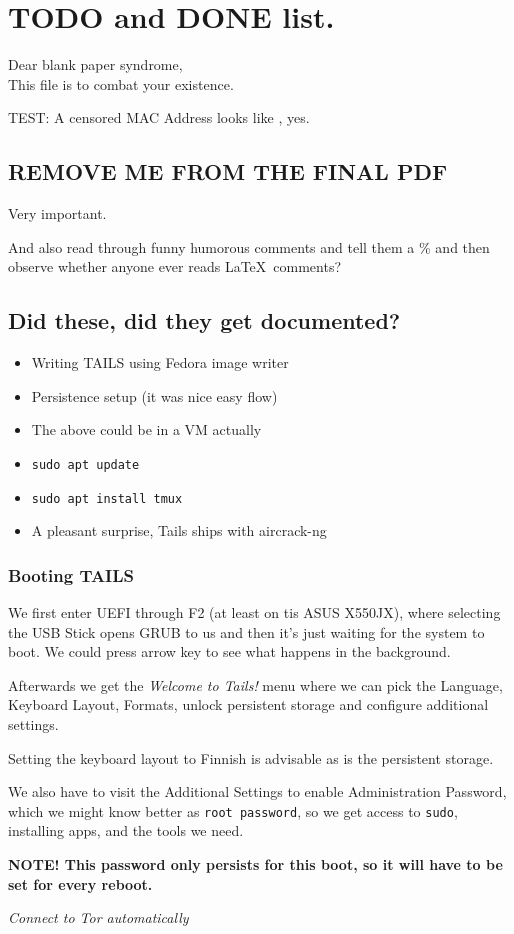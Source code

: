 \documentclass[../wifi-security.tex]{subfiles}
\begin{document}
\section{TODO and DONE list.}

Dear blank paper syndrome,\\This file is to combat your existence.

TEST: A censored MAC Address looks like \MACADDR, yes.

\subsection*{REMOVE ME FROM THE FINAL PDF}

Very important.

And also read through funny humorous comments and tell them a \% and then observe whether anyone ever reads \LaTeX\ comments?

\subsection*{Did these, did they get documented?}

\begin{itemize}
	\item{Writing TAILS using Fedora image writer}
	\item{Persistence setup (it was nice easy flow)}
	\item{The above could be in a VM actually}
	\item{\texttt{sudo apt update}}
	\item{\texttt{sudo apt install tmux}}
	\item{A pleasant surprise, Tails ships with aircrack-ng}
\end{itemize}

\subsubsection*{Booting TAILS}

We first enter UEFI through F2 (at least on tis ASUS X550JX), where selecting the USB Stick opens GRUB to us and then it's just waiting for the system to boot. We could press arrow key to see what happens in the background.


Afterwards we get the \textit{Welcome to Tails!} menu where we can pick the Language, Keyboard Layout, Formats, unlock persistent storage and configure additional settings.

Setting the keyboard layout to Finnish is advisable as is the persistent storage.

We also have to visit the Additional Settings to enable Administration Password, which we might know better as \texttt{root password}, so we get access to \texttt{sudo}, installing apps, and the tools we need.

\textbf{NOTE! This password only persists for this boot, so it will have to be set for every reboot.}

\textit{Connect to Tor automatically}
\end{document}

